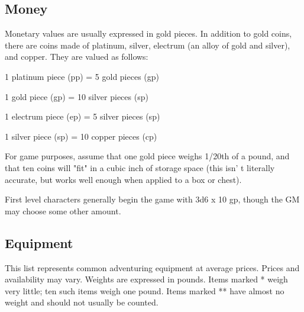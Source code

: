 \documentclass[a4paper,twoside,openany,10pt]{book}
\begin{document}
\begin{multicols}{2}
	
\subsection{Money}\label{money}

Monetary values are usually expressed in gold pieces. In addition to gold coins, there are coins made of platinum, silver, electrum (an alloy of gold and silver), and copper. They are valued as follows:

1 platinum piece (pp) = 5 gold pieces (gp)

1 gold piece (gp) = 10 silver pieces (sp)

1 electrum piece (ep) = 5 silver pieces (sp)

1 silver piece (sp) = 10 copper pieces (cp)

For game purposes, assume that one gold piece weighs 1/20th of a pound, and that ten coins will "fit" in a cubic inch of storage space (this isn' t literally accurate, but works well enough when applied to a box or chest).

First level characters generally begin the game with 3d6 x 10 gp, though the GM may choose some other amount.

\subsection{Equipment}\label{equipment}

This list represents common adventuring equipment at average prices. Prices and availability may vary. Weights are expressed in pounds. Items marked * weigh very little; ten such items weigh one pound. Items marked ** have almost no weight and should not usually be counted.\\


\end{multicols}
\end{document}
